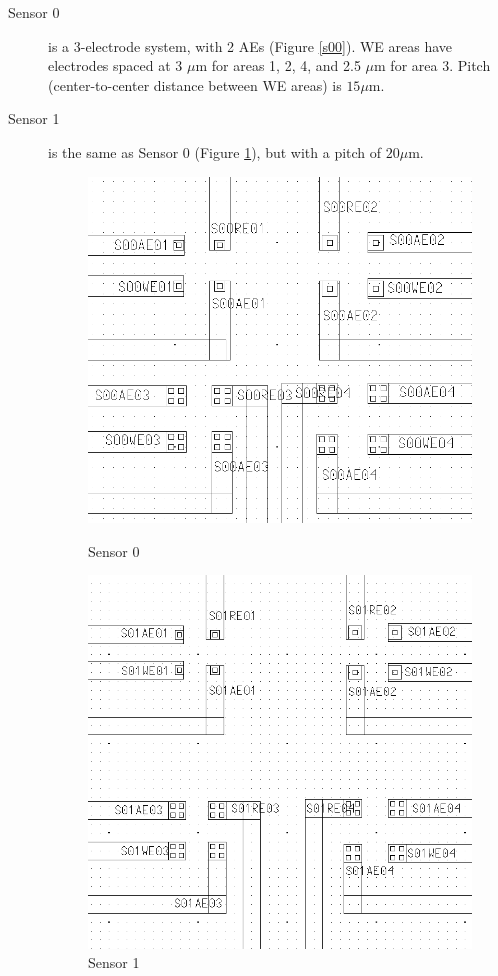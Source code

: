 \begin{description}

\item[Sensor 0] is a 3-electrode system, with 2 AEs (Figure \ref{s00}). WE areas have electrodes spaced at 3 $\mu \mathrm{m}$ for areas 1, 2, 4, and 2.5 $\mu \mathrm{m}$ for area 3. Pitch (center-to-center distance between WE areas) is $15 \mu \mathrm{m}$.
\item[Sensor 1] is the same as Sensor 0 (Figure \ref{s01}), but with a pitch of $20 \mu \mathrm{m}$.

\begin{figure}
	\begin{minipage}{0.5\linewidth}
		\centering
		\includegraphics[width=0.6\linewidth]{figures/s00.png}
		\caption{Sensor 0}
		\label{s00}
	\end{minipage}
	\begin{minipage}{0.5\linewidth}
		\centering
		\includegraphics[width=0.6\linewidth]{figures/s01.png}
		\caption{Sensor 1}
		\label{s01}
	\end{minipage}
\end{figure}


\end{description}

